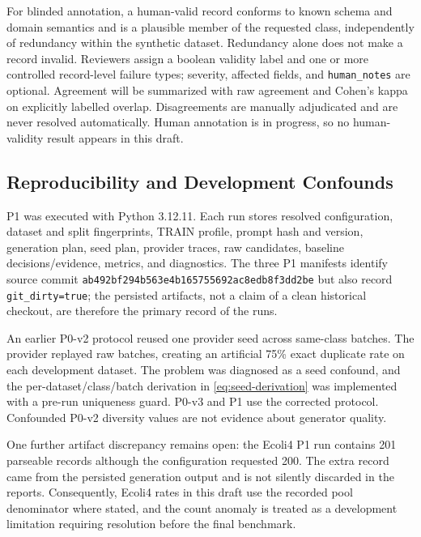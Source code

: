 For blinded annotation, a human-valid record conforms to known schema and
domain semantics and is a plausible member of the requested class,
independently of redundancy within the synthetic dataset. Redundancy alone
does not make a record invalid. Reviewers assign a boolean validity label and
one or more controlled record-level failure types; severity, affected fields,
and \texttt{human\_notes} are optional. Agreement will be summarized with raw
agreement and Cohen's kappa on explicitly labelled overlap. Disagreements are
manually adjudicated and are never resolved automatically. Human annotation is
in progress, so no human-validity result appears in this draft.

\subsection{Reproducibility and Development Confounds}
\label{sec:reproducibility}

P1 was executed with Python 3.12.11. Each run stores resolved configuration,
dataset and split fingerprints, TRAIN profile, prompt hash and version,
generation plan, seed plan, provider traces, raw candidates, baseline
decisions/evidence, metrics, and diagnostics. The three P1 manifests identify
source commit \texttt{ab492bf294b563e4b165755692ac8edb8f3dd2be} but also record
\texttt{git\_dirty=true}; the persisted artifacts, not a claim of a clean historical
checkout, are therefore the primary record of the runs.

An earlier P0-v2 protocol reused one provider seed across same-class batches.
The provider replayed raw batches, creating an artificial 75\% exact duplicate
rate on each development dataset. The problem was diagnosed as a seed
confound, and the per-dataset/class/batch derivation in
\cref{eq:seed-derivation} was implemented with a pre-run uniqueness guard.
P0-v3 and P1 use the corrected protocol. Confounded P0-v2 diversity values are
not evidence about generator quality.

One further artifact discrepancy remains open: the Ecoli4 P1 run contains 201
parseable records although the configuration requested 200. The extra record
came from the persisted generation output and is not silently discarded in
the reports. Consequently, Ecoli4 rates in this draft use the recorded pool
denominator where stated, and the count anomaly is treated as a development
limitation requiring resolution before the final benchmark.
